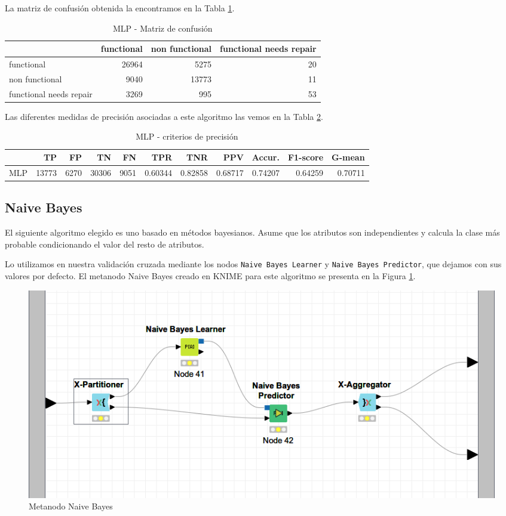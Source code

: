 \documentclass[a4paper, 20pt]{article}
\begin{document}
La matriz de confusión obtenida la encontramos en la Tabla \ref{tab:CMMLP}.

\begin{table}[H]
\centering
  \caption{MLP - Matriz de confusión}
  \label{tab:CMMLP}
  \begin{tabular}{lrrr}
\toprule
    & functional & non functional & functional needs repair\\ \midrule
    functional & 26964 & 5275 & 20\\
    non functional & 9040 & 13773 & 11\\
    functional needs repair & 3269 & 995 & 53\\
    \bottomrule
  \end{tabular}
\end{table}

Las diferentes medidas de precisión asociadas a este algoritmo las vemos en la Tabla \ref{tab:MLP}.

\begin{table}[H]
  \centering
  \caption{MLP - criterios de precisión}
  \label{tab:MLP}
  \begin{tabular}{lrrrrrrrrrr}
    \toprule
    & TP & FP & TN & FN & TPR & TNR & PPV & Accur. & F1-score & G-mean\\ \midrule
MLP & 13773 & 6270 & 30306 & 9051 & 0.60344 & 0.82858 & 0.68717 & 0.74207 & 0.64259 & 0.70711\\
\bottomrule
  \end{tabular}
\end{table}

\subsection{Naive Bayes}

El siguiente algoritmo elegido es uno basado en métodos bayesianos. Asume que los atributos son independientes y calcula la clase más probable condicionando el valor del resto de atributos.

Lo utilizamos en nuestra validación cruzada mediante los nodos \texttt{Naive Bayes Learner} y \texttt{Naive Bayes Predictor}, que dejamos con sus valores por defecto. El metanodo Naive Bayes creado en KNIME para este algoritmo se presenta en la Figura \ref{fig:NaiveBayes}.

\begin{figure}[H]
    \centering
    \includegraphics[width=1\textwidth]{NaiveBayes}
    \caption{Metanodo Naive Bayes}
    \label{fig:NaiveBayes}
\end{figure}
\end{document}
